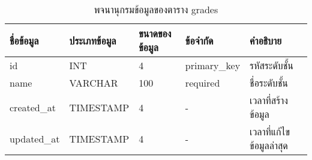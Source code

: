 \begin{table}[H]
    \caption{พจนานุกรมข้อมูลของตาราง grades}
    \label{tab:database-grades}
    \begin{tabularx}{\textwidth}{ | p{2.25cm} | p{2.20cm} | p{2.45cm} | p{2.15cm} | X | }
    \hline
    \textbf{ชื่อข้อมูล} & \textbf{ประเภทข้อมูล} & \textbf{ขนาดของข้อมูล} & \textbf{ข้อจำกัด} & \textbf{คำอธิบาย} \\
    \hline
    id & INT & 4 & primary\_key & รหัสระดับชั้น \\
    \hline
    name & VARCHAR & 100 & required & ชื่อระดับชั้น \\
    \hline
    created\_at & TIMESTAMP & 4 & - & เวลาที่สร้างข้อมูล \\
    \hline
    updated\_at & TIMESTAMP & 4 & - & เวลาที่แก้ไขข้อมูลล่าสุด \\
    \hline
    \end{tabularx}
\end{table}
